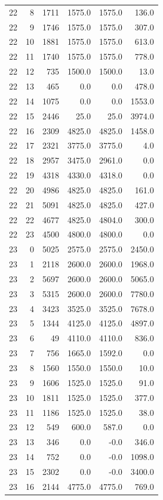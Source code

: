 \begin{longtable}{rrrrrr}
22 & 8 & 1711 & 1575.0 & 1575.0 & 136.0\\
22 & 9 & 1746 & 1575.0 & 1575.0 & 307.0\\
22 & 10 & 1881 & 1575.0 & 1575.0 & 613.0\\
22 & 11 & 1740 & 1575.0 & 1575.0 & 778.0\\
22 & 12 & 735 & 1500.0 & 1500.0 & 13.0\\
22 & 13 & 465 & 0.0 & 0.0 & 478.0\\
22 & 14 & 1075 & 0.0 & 0.0 & 1553.0\\
22 & 15 & 2446 & 25.0 & 25.0 & 3974.0\\
22 & 16 & 2309 & 4825.0 & 4825.0 & 1458.0\\
22 & 17 & 2321 & 3775.0 & 3775.0 & 4.0\\
22 & 18 & 2957 & 3475.0 & 2961.0 & 0.0\\
22 & 19 & 4318 & 4330.0 & 4318.0 & 0.0\\
22 & 20 & 4986 & 4825.0 & 4825.0 & 161.0\\
22 & 21 & 5091 & 4825.0 & 4825.0 & 427.0\\
22 & 22 & 4677 & 4825.0 & 4804.0 & 300.0\\
22 & 23 & 4500 & 4800.0 & 4800.0 & 0.0\\
23 & 0 & 5025 & 2575.0 & 2575.0 & 2450.0\\
23 & 1 & 2118 & 2600.0 & 2600.0 & 1968.0\\
23 & 2 & 5697 & 2600.0 & 2600.0 & 5065.0\\
23 & 3 & 5315 & 2600.0 & 2600.0 & 7780.0\\
23 & 4 & 3423 & 3525.0 & 3525.0 & 7678.0\\
23 & 5 & 1344 & 4125.0 & 4125.0 & 4897.0\\
23 & 6 & 49 & 4110.0 & 4110.0 & 836.0\\
23 & 7 & 756 & 1665.0 & 1592.0 & 0.0\\
23 & 8 & 1560 & 1550.0 & 1550.0 & 10.0\\
23 & 9 & 1606 & 1525.0 & 1525.0 & 91.0\\
23 & 10 & 1811 & 1525.0 & 1525.0 & 377.0\\
23 & 11 & 1186 & 1525.0 & 1525.0 & 38.0\\
23 & 12 & 549 & 600.0 & 587.0 & 0.0\\
23 & 13 & 346 & 0.0 & -0.0 & 346.0\\
23 & 14 & 752 & 0.0 & -0.0 & 1098.0\\
23 & 15 & 2302 & 0.0 & -0.0 & 3400.0\\
23 & 16 & 2144 & 4775.0 & 4775.0 & 769.0\\

\end{longtable}
